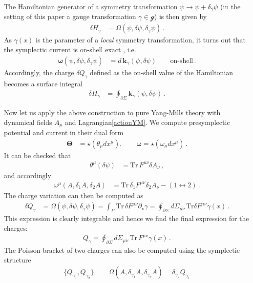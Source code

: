 \documentclass[11pt,a4paper]{article}
\def\calsg{{\boldsymbol{\mathscr g}}}
\def\mn{{\mu\nu}}
\def\pd{\partial}
\def\de{\delta}
\def\Tr{\mathrm{Tr}}
\newcommand{\bomega}{{\boldsymbol \omega}}
\newcommand{\bTheta}{{\boldsymbol \Theta}}
\newcommand{\bk}{{\boldsymbol k}}
\begin{document}
    The Hamiltonian generator of a symmetry transformation $\psi\to \psi+\de_\gamma \psi$ (in the setting of this paper a gauge transformation $\gamma\in\calsg$) is then given by
    \begin{align}\label{var H def}
    \de H_\gamma &=\Omega(\psi,\de\psi,\de_\gamma\psi)\,.
    \end{align}
    As $\gamma(x)$ is the parameter of a \textit{local} symmetry transformation, it turns out that the symplectic current is on-shell exact \cite{Iyer:1994ys,Barnich:2001jy}, i.e. 
    \begin{align}\label{theorem-charges}
    \bomega(\psi,\de\psi,\de_\gamma\psi)&=d\,\bk_\gamma (\psi,\de\psi)\qquad\mbox{on-shell}\,.
    \end{align}
    Accordingly, the charge $\de Q_\gamma$ defined as the on-shell value of the Hamiltonian becomes a surface integral
    \begin{align}\label{def-Hamiltonian}
    \de H_\gamma &=\oint_{\pd\Sigma}\bk_\gamma (\psi,\de\psi)\,.
    \end{align}
    
    Now let us apply the above construction to pure Yang-Mills theory with dynamical fields $A_\mu$ and Lagrangian\eqref{actionYM}. We compute presymplectic potential and current in their dual form
    \begin{align}
    \bTheta&=\star(\theta_\mu dx^\mu),\qquad \bomega=\star(\omega_\mu dx^\mu)\,.
    \end{align}
    It can be checked that 
    \begin{align}
    \theta^\mu(\de\psi)&=\Tr\, F^\mn \de A_\nu\,,
    \end{align}
    and accordingly
    \begin{align}\label{symplectic form EM}
    \omega^\mu(A,\de_1A,\de_2A) &=\Tr\, \de_1 F^{\mn}\de_2 A_\nu-(1\leftrightarrow 2)\,.
    \end{align}
    The charge variation can then be computed as
    \begin{align}
    \de Q_\gamma&=\Omega(\psi,\de\psi,\de_\gamma\psi)=\int_{\Sigma}\Tr\, \de F^{\mn}\pd_\nu \gamma=\oint_{\pd\Sigma} d\Sigma_\mn\, \Tr \de F^\mn \gamma(x)\,.
    \end{align}
    This expression is clearly integrable and hence we find the final expression for the charges:
    \begin{align}\label{charges-YM}
    \boxed{Q_\gamma=\oint_{\pd\Sigma} d\Sigma_\mn\, \Tr\,F^\mn \gamma(x)\,.}
    \end{align}
    The Poisson bracket of two charges can also be computed using the symplectic structure 
    \begin{align}\label{Poisson bracket}
            \{Q_{\gamma_1},Q_{\gamma_2}\}&=\Omega(A,\de_{\gamma_1} A,\de_{\gamma_2}A)=\de_{\gamma_2} Q_{\gamma_1}
    \end{align}
    
    
    
    
\end{document}
